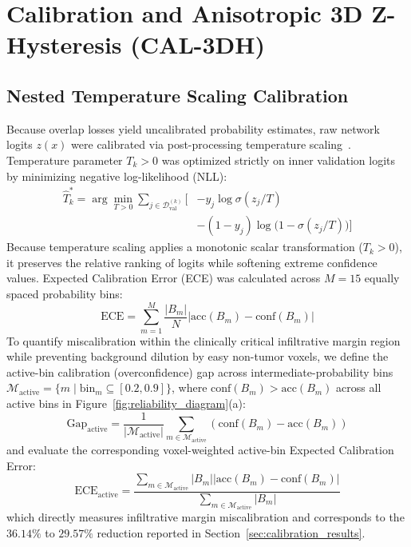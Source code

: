 \documentclass[preprint,12pt,authoryear]{elsarticle}
\begin{document}
\section{Calibration and Anisotropic 3D Z-Hysteresis (CAL-3DH)}
\label{sec:calibration_hysteresis}

\subsection{Nested Temperature Scaling Calibration}
Because overlap losses yield uncalibrated probability estimates, raw network logits $z(x)$ were calibrated via post-processing temperature scaling~\citep{guo2017calibration}. Temperature parameter $T_k > 0$ was optimized strictly on inner validation logits by minimizing negative log-likelihood (NLL):
\begin{equation}
\begin{aligned}
\hat{T}_k^* = \arg\min_{T > 0} \sum_{j \in \mathcal{D}_{\text{val}}^{(k)}} \Big[ &-y_j \log \sigma(z_j / T) \\
&-(1 - y_j) \log \big(1 - \sigma(z_j / T)\big) \Big]
\end{aligned}
\end{equation}
Because temperature scaling applies a monotonic scalar transformation ($T_k > 0$), it preserves the relative ranking of logits while softening extreme confidence values. Expected Calibration Error (ECE) was calculated across $M = 15$ equally spaced probability bins:
\begin{equation}
\text{ECE} = \sum_{m=1}^M \frac{|B_m|}{N} \left| \text{acc}(B_m) - \text{conf}(B_m) \right|
\end{equation}
To quantify miscalibration within the clinically critical infiltrative margin region while preventing background dilution by easy non-tumor voxels, we define the active-bin calibration (overconfidence) gap across intermediate-probability bins $\mathcal{M}_{\text{active}} = \{m \mid \text{bin}_m \subseteq [0.2, 0.9]\}$, where $\text{conf}(B_m) > \text{acc}(B_m)$ across all active bins in Figure~\ref{fig:reliability_diagram}(a):
\begin{equation}
\text{Gap}_{\text{active}} = \frac{1}{|\mathcal{M}_{\text{active}}|} \sum_{m \in \mathcal{M}_{\text{active}}} \left( \text{conf}(B_m) - \text{acc}(B_m) \right)
\end{equation}
and evaluate the corresponding voxel-weighted active-bin Expected Calibration Error:
\begin{equation}
\text{ECE}_{\text{active}} = \frac{\sum_{m \in \mathcal{M}_{\text{active}}} |B_m| \left| \text{acc}(B_m) - \text{conf}(B_m) \right|}{\sum_{m \in \mathcal{M}_{\text{active}}} |B_m|}
\end{equation}
which directly measures infiltrative margin miscalibration and corresponds to the $36.14\%$ to $29.57\%$ reduction reported in Section~\ref{sec:calibration_results}.
\end{document}
